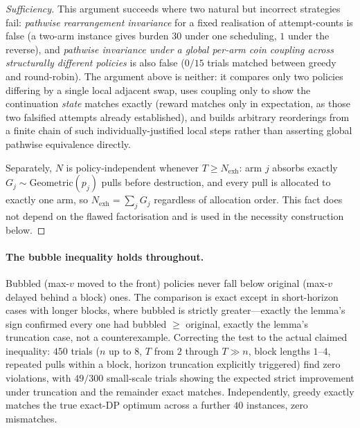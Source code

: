 \begin{proof}[Sufficiency]
This argument succeeds where two natural but incorrect strategies fail: \emph{pathwise rearrangement invariance} for a fixed realisation of
attempt-counts is false (a two-arm instance gives burden $30$ under one
scheduling, $1$ under the reverse), and \emph{pathwise invariance under a
global per-arm coin coupling across structurally different policies} is
also false ($0/15$ trials matched between greedy and round-robin). The
argument above is neither: it compares only two policies differing by a
single local adjacent swap, uses coupling only to show the continuation
\emph{state} matches exactly (reward matches only in expectation, as those
two falsified attempts already established), and builds arbitrary
reorderings from a finite chain of such individually-justified local steps
rather than asserting global pathwise equivalence directly.

Separately, $N$ is policy-independent whenever $T \ge N_{\mathrm{exh}}$: arm
$j$ absorbs exactly $G_j \sim \mathrm{Geometric}(p_j)$ pulls before
destruction, and every pull is allocated to exactly one arm, so
$N_{\mathrm{exh}} = \sum_j G_j$ regardless of allocation order. This fact
does not depend on the flawed factorisation and is used in the necessity
construction below.
\end{proof}

\paragraph{The bubble inequality holds throughout.} Bubbled (max-$v$ moved to the front)
policies never fall below original (max-$v$ delayed behind a block) ones.
The comparison is exact except in short-horizon cases with longer blocks,
where bubbled is strictly greater---exactly the lemma's
sign confirmed every one had bubbled $\ge$ original, exactly the lemma's
truncation case, not a counterexample. Correcting the test to the actual
claimed inequality: $450$ trials ($n$ up to $8$, $T$ from $2$ through
$T\gg n$, block lengths $1$--$4$, repeated pulls within a block, horizon
truncation explicitly triggered) find zero violations, with $49/300$ small-scale
trials showing the expected strict improvement under truncation and the
remainder exact matches. Independently, greedy exactly matches the true
exact-DP optimum across a further $40$ instances, zero mismatches.

